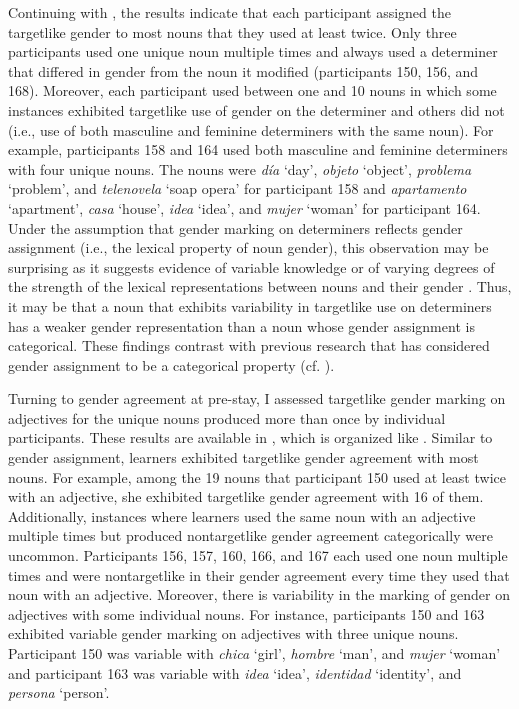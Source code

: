 \documentclass[output=paper,colorlinks,citecolor=brown,modfonts,nonflat]{../langscibook}
\begin{document}
Continuing with , the results indicate that each participant assigned the targetlike gender to most nouns that they used at least twice. Only three participants used one unique noun multiple times and always used a determiner that differed in gender from the noun it modified (participants 150, 156, and 168). Moreover, each participant used between one and 10 nouns in which some instances exhibited targetlike use of gender on the determiner and others did not (i.e., use of both masculine and feminine determiners with the same noun). For example, participants 158 and 164 used both masculine and feminine determiners with four unique nouns. The nouns were \textit{día} ‘day’, \textit{objeto} ‘object’, \textit{problema} ‘problem’, and \textit{telenovela} ‘soap opera’ for participant 158 and \textit{apartamento} ‘apartment’, \textit{casa} ‘house’, \textit{idea} ‘idea’, and \textit{mujer} ‘woman’ for participant 164. Under the assumption that gender marking on determiners reflects gender assignment (i.e., the lexical property of noun gender), this observation may be surprising as it suggests evidence of variable knowledge or of varying degrees of the strength of the lexical representations between nouns and their gender \citep{HalberstadtEtAl2018}. Thus, it may be that a noun that exhibits variability in targetlike use on determiners has a weaker gender representation than a noun whose gender assignment is categorical. These findings contrast with previous research that has considered gender assignment to be a categorical property (cf. \citealt{Alarcón2010}).

Turning to gender agreement at pre-stay, I assessed targetlike gender marking on adjectives for the unique nouns produced more than once by individual participants. These results are available in , which is organized like . Similar to gender assignment, learners exhibited targetlike gender agreement with most nouns. For example, among the 19 nouns that participant 150 used at least twice with an adjective, she exhibited targetlike gender agreement with 16 of them. Additionally, instances where learners used the same noun with an adjective multiple times but produced nontargetlike gender agreement categorically were uncommon. Participants 156, 157, 160, 166, and 167 each used one noun multiple times and were nontargetlike in their gender agreement every time they used that noun with an adjective. Moreover, there is variability in the marking of gender on adjectives with some individual nouns. For instance, participants 150 and 163 exhibited variable gender marking on adjectives with three unique nouns. Participant 150 was variable with \textit{chica} ‘girl’, \textit{hombre} ‘man’, and \textit{mujer} ‘woman’ and participant 163 was variable with \textit{idea} ‘idea’, \textit{identidad} ‘identity’, and \textit{persona} ‘person’.
\end{document}

